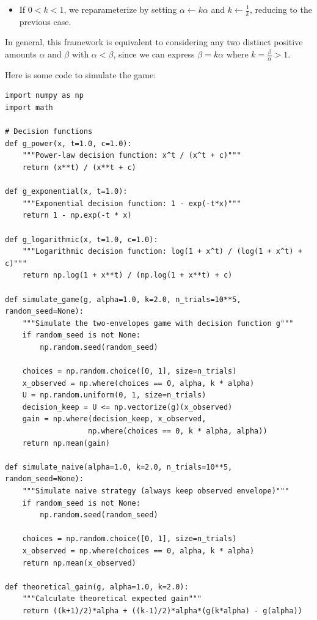 \begin{solution}
\begin{remark}
\begin{itemize}
            \item If \( 0 < k < 1 \), we reparameterize by setting \( \alpha \leftarrow k\alpha \) and \( k \leftarrow \frac{1}{k} \), reducing to the previous case.
        \end{itemize}
        In general, this framework is equivalent to considering any two distinct positive amounts \( \alpha \) and \( \beta \) with \( \alpha < \beta \), since we can express \( \beta = k\alpha \) where \( k = \frac{\beta}{\alpha} > 1 \).
    \end{remark}
    Here is some code to simulate the game:
    \begin{lstlisting}[style=mypython, caption={Decision Functions and Simulation Code}]
import numpy as np
import math

# Decision functions
def g_power(x, t=1.0, c=1.0):
    """Power-law decision function: x^t / (x^t + c)"""
    return (x**t) / (x**t + c)

def g_exponential(x, t=1.0):
    """Exponential decision function: 1 - exp(-t*x)"""
    return 1 - np.exp(-t * x)

def g_logarithmic(x, t=1.0, c=1.0):
    """Logarithmic decision function: log(1 + x^t) / (log(1 + x^t) + c)"""
    return np.log(1 + x**t) / (np.log(1 + x**t) + c)

def simulate_game(g, alpha=1.0, k=2.0, n_trials=10**5, random_seed=None):
    """Simulate the two-envelopes game with decision function g"""
    if random_seed is not None:
        np.random.seed(random_seed)
    
    choices = np.random.choice([0, 1], size=n_trials)
    x_observed = np.where(choices == 0, alpha, k * alpha)
    U = np.random.uniform(0, 1, size=n_trials)
    decision_keep = U <= np.vectorize(g)(x_observed)
    gain = np.where(decision_keep, x_observed, 
                   np.where(choices == 0, k * alpha, alpha))
    return np.mean(gain)

def simulate_naive(alpha=1.0, k=2.0, n_trials=10**5, random_seed=None):
    """Simulate naive strategy (always keep observed envelope)"""
    if random_seed is not None:
        np.random.seed(random_seed)
    
    choices = np.random.choice([0, 1], size=n_trials)
    x_observed = np.where(choices == 0, alpha, k * alpha)
    return np.mean(x_observed)

def theoretical_gain(g, alpha=1.0, k=2.0):
    """Calculate theoretical expected gain"""
    return ((k+1)/2)*alpha + ((k-1)/2)*alpha*(g(k*alpha) - g(alpha))


\end{lstlisting}
\end{solution}
